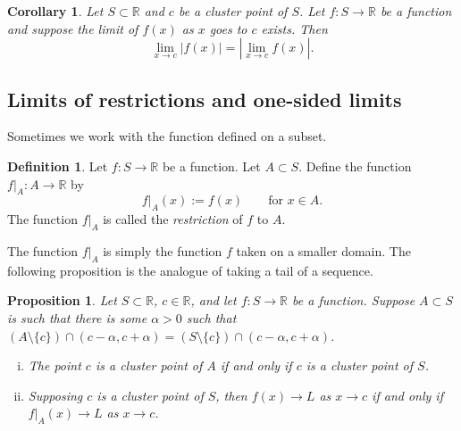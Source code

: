 \documentclass[12pt]{book}
\newcommand{\abs}[1]{\left\lvert {#1} \right\rvert}
\newcommand{\R}{{\mathbb{R}}}
\newcommand{\myindex}[1]{#1\index{#1}}
\theoremstyle{plain}
\newtheorem{prop}[thm]{Proposition}
\newtheorem{cor}[thm]{Corollary}
\theoremstyle{remark}
\theoremstyle{definition}
\newtheorem{defn}[thm]{Definition}
\theoremstyle{exercise}
\theoremstyle{example}
\begin{document}
\begin{cor} \label{fabs:cor}
Let $S \subset \R$ and $c$ be a cluster point of $S$.  Let $f \colon S \to
\R$ be a function and suppose the limit of $f(x)$ as $x$ goes to $c$ exists.
Then
\begin{equation*}
\lim_{x\to c} \abs{f(x)} =
\abs{\lim_{x\to c} f(x)}.
\end{equation*}
\end{cor}

\subsection{Limits of restrictions and one-sided limits}

Sometimes we work with the function defined on a subset.

\begin{defn}
Let $f \colon S \to \R$ be a function.  Let $A \subset S$.  Define the
function $f|_A \colon A \to \R$ by
\begin{equation*}
f|_A (x) := f(x)  \qquad \text{for $x \in A$}.
\end{equation*}
The function
$f|_A$ is called the \emph{\myindex{restriction}} of $f$ to $A$.
\end{defn}

The function $f|_A$ is simply the function $f$ taken on a smaller domain.
The following proposition is the analogue of taking a tail of a sequence.

\begin{prop} \label{prop:limrest}
Let $S \subset \R$, $c \in \R$, and
let $f \colon S
\to \R$ be a function.
Suppose
$A \subset S$ is such that there is some $\alpha > 0$ such that
$(A \setminus \{ c \}) \cap (c-\alpha,c+\alpha) = (S \setminus \{ c \}) \cap (c-\alpha,c+\alpha)$.
\begin{enumerate}[(i)]
\item The point $c$ is a cluster point of $A$ if and only if $c$ is a cluster point
of $S$.
\item Supposing $c$ is a cluster point of $S$, then $f(x) \to L$ as $x \to c$ if and only if
$f|_A(x) \to L$ as $x \to c$.
\end{enumerate}
\end{prop}
\end{document}
